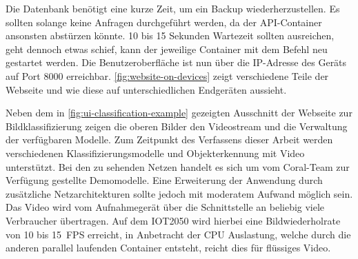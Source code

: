 Die Datenbank benötigt eine kurze Zeit,
um ein Backup wiederherzustellen.
Es sollten solange keine Anfragen durchgeführt werden,
da der API-Container ansonsten abstürzen könnte.
10 bis 15 Sekunden Wartezeit sollten ausreichen, geht dennoch etwas schief,
kann der jeweilige Container mit
dem Befehl  neu gestartet werden.
Die Benutzeroberfläche ist nun über die IP-Adresse des Geräts
auf Port 8000 erreichbar.
\autoref{fig:website-on-devices} zeigt verschiedene
Teile der Webseite und wie diese auf unterschiedlichen Endgeräten aussieht.
\newpage


\noindent
Neben dem in \autoref{fig:ui-classification-example} gezeigten
Ausschnitt der Webseite zur Bildklassifizierung zeigen die
oberen Bilder den Videostream und die Verwaltung der verfügbaren
Modelle. Zum Zeitpunkt des Verfassens dieser Arbeit werden
verschiedenen Klassifizierungsmodelle und Objekterkennung
mit Video unterstützt. Bei den zu sehenden Netzen
handelt es sich um vom Coral-Team zur Verfügung gestellte
Demomodelle. Eine Erweiterung der Anwendung
durch zusätzliche Netzarchitekturen sollte
jedoch mit moderatem Aufwand möglich sein.
Das Video wird vom Aufnahmegerät über die Schnittstelle
an beliebig viele Verbraucher übertragen.
Auf dem IOT2050 wird hierbei eine
Bildwiederholrate von 10 bis \qty{15}{FPS} erreicht,
in Anbetracht der CPU Auslastung, welche durch die anderen
parallel laufenden Container entsteht,
reicht dies für flüssiges Video.